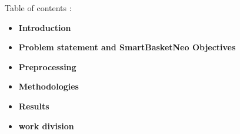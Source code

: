 \documentclass[10pt]{beamer}
\begin{document}
\begin{frame}{Table of contents :}
\vspace*{0.6cm}
\begin{center}
\begin{minipage}{0.75\textwidth}
    \begin{itemize}\large\setlength{\itemsep}{0.45cm}
        \item \textbf{\color{black} Introduction}
        \item \textbf{\color{black} Problem statement and SmartBasketNeo Objectives}
        \item \textbf{\color{black} Preprocessing}
        \item \textbf{\color{black} Methodologies}
        \item \textbf{\color{black} Results}
        \item \textbf{\color{black} work division}
    \end{itemize}
\end{minipage}
\end{center}
\end{frame}
\end{document}
